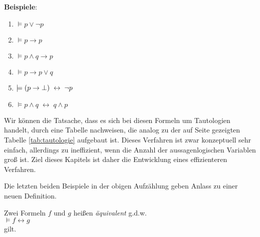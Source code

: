 \noindent
\textbf{Beispiele}:
\begin{enumerate}
\item $\models p \vee \neg p$
\item $\models p \rightarrow p$
\item $\models p \wedge q \rightarrow p$
\item $\models p \rightarrow p \vee q$
\item $\models (p \rightarrow \bot) \;\leftrightarrow\; \neg p$
\item $\models p \wedge q \;\leftrightarrow\; q \wedge p$
\end{enumerate}
Wir k\"{o}nnen die Tatsache, dass es sich bei diesen Formeln um Tautologien handelt, durch
eine Tabelle nachweisen, die analog zu der auf Seite \pageref{tab:tautologie} gezeigten
Tabelle \ref{tab:tautologie} aufgebaut ist.  Dieses Verfahren ist zwar konzeptuell sehr
einfach, allerdings zu ineffizient, wenn die Anzahl der aussagenlogischen Variablen gro\ss{}
ist.  Ziel dieses Kapitels ist daher die Entwicklung eines effizienteren Verfahren.

Die letzten beiden Beispiele in der obigen Aufz\"{a}hlung geben Anlass zu einer neuen Definition.
\begin{Definition}[\"{A}quivalent]
  Zwei Formeln $f$ und $g$ hei\ss{}en \emph{\color{blue}\"{a}quivalent} g.d.w.  \\[0.2cm]
  \hspace*{1.3cm} $\models f \leftrightarrow g$ 
  \\[0.1cm]
  gilt.
  \eox
\end{Definition}

